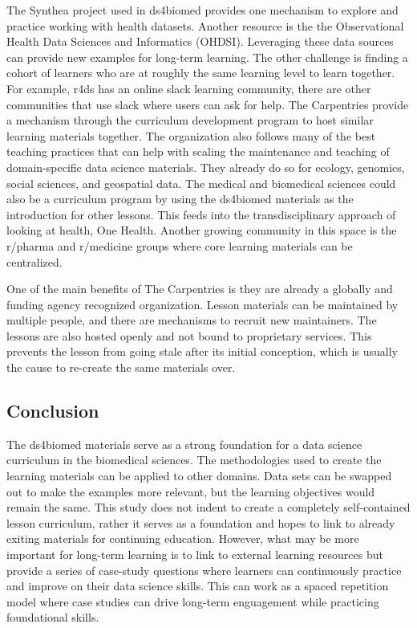 \documentclass[030-workshop.tex]{subfiles}
\begin{document}
        The Synthea project used in ds4biomed provides one mechanism to explore and practice working with health datasets.
        Another resource is the the Observational Health Data Sciences and Informatics (OHDSI).
        Leveraging these data sources can provide new examples for long-term learning.
        The other challenge is finding a cohort of learners who are at roughly the same learning level to learn together.
        For example, r4ds has an online slack learning community,
        there are other communities that use slack where users can ask for help.
        The Carpentries provide a mechanism through the curriculum development program to host similar learning materials together.
        The organization also follows many of the best teaching practices that can help with scaling the maintenance and
        teaching of domain-specific data science materials.
        They already do so for ecology, genomics, social sciences, and geospatial data.
        The medical and biomedical sciences could also be a curriculum program by using the ds4biomed materials as the introduction
        for other lessons.
        This feeds into the transdisciplinary approach of looking at health, One Health.
        Another growing community in this space is the r/pharma and r/medicine groups where core learning materials
        can be centralized.

        One of the main benefits of The Carpentries is they are already a globally and funding agency recognized organization.
        Lesson materials can be maintained by multiple people, and there are mechanisms to recruit new maintainers.
        The lessons are also hosted openly and not bound to proprietary services.
        This prevents the lesson from going stale after its initial conception,
        which is usually the cause to re-create the same materials over.

    \subsection{Conclusion}

        The ds4biomed materials serve as a strong foundation for a data science curriculum in the biomedical sciences.
        The methodologies used to create the learning materials can be applied to other domains.
        Data sets can be swapped out to make the examples more relevant,
        but the learning objectives would remain the same.
        This study does not indent to create a completely self-contained lesson curriculum,
        rather it serves as a foundation and hopes to link to already exiting materials for continuing education.
        However, what may be more important for long-term learning
        is to link to external learning resources but provide a series of case-study questions
        where learners can continuously practice and improve on their data science skills.
        This can work as a spaced repetition model where case studies can drive long-term enguagement while practicing
        foundational skills.
\end{document}
